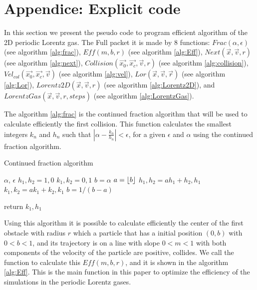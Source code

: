 \documentclass{iopart}
\begin{document}
\DeclarePairedDelimiter\ceil{\lceil}{\rceil}
\DeclarePairedDelimiter\floor{\lfloor}{\rfloor}

\appendix
\section{Appendice: Explicit code} 

In this section we present the pseudo code to program efficient algorithm of the 2D periodic Lorentz gas. The Full packet it is made by 8 functions: 
$Frac(\alpha, \epsilon)$ (see algorithm \ref{alg:frac}), 
$Eff(m, b, r)$ (see algorithm \ref{alg:Eff}),  
$Next(\vec{x},\vec{v},r)$ (see algorithm \ref{alg:next}), 
$Collision(\vec{x_0},\vec{x_c}, \vec{v},r)$ (see algorithm \ref{alg:collision}), 
$Vel_{col}(\vec{x_0},\vec{x_c},\vec{v})$ (see algorithm \ref{alg:vel}), 
$Lor(\vec{x},\vec{v},\vec{r})$ (see algorithm \ref{alg:Lor}),
$Lorentz2D(\vec{x},\vec{v},r)$ (see algorithm \ref{alg:Lorentz2D}), and 
$LorentzGas(\vec{x},\vec{v},r,steps)$ (see algorithm \ref{alg:LorentzGas}).   

The algorithm \ref{alg:frac} is the continued fraction algorithm that will be used to calculate efficiently the first collision. This function calculates the smallest integers $k_n$ and $h_n$ such that $|\alpha -\frac{k_n}{h_n}|<\epsilon$, for a given $\epsilon$ and $\alpha$ using the continued fraction algorithm. 

\begin{algorithm}
\caption{Continued fraction algorithm}
\label{alg:frac}
\begin{algorithmic}
 {$\alpha$, $\epsilon$}
\State   $h_1, h_2 = 1, 0$
\State   $k_1, k_2 = 0, 1$
\State   $b = \alpha$
\State       $a = \floor*{b}$
\State       $h_1, h_2 = a h_1 + h_2, h_1$
\State       $k_1, k_2 = a k_1 + k_2, k_1$
\State       $b = 1/(b - a)$
\EndWhile

   return $k_1, h_1$
\EndFunction
\end{algorithmic}
\end{algorithm}

Using this algorithm it is possible to calculate efficiently the center of the first obstacle with radius $r$ which a particle that has a initial position $(0,b)$ with $0<b<1$, and its trajectory is on a line with slope $0<m<1$ with both components of the velocity of the particle are positive, collides. We call the function to calculate this $Eff(m,b,r)$, and it is shown in the algorithm \ref{alg:Eff}. This is the main function in this paper to optimize the efficiency of the simulations in the periodic Lorentz gases. 
\end{document}
